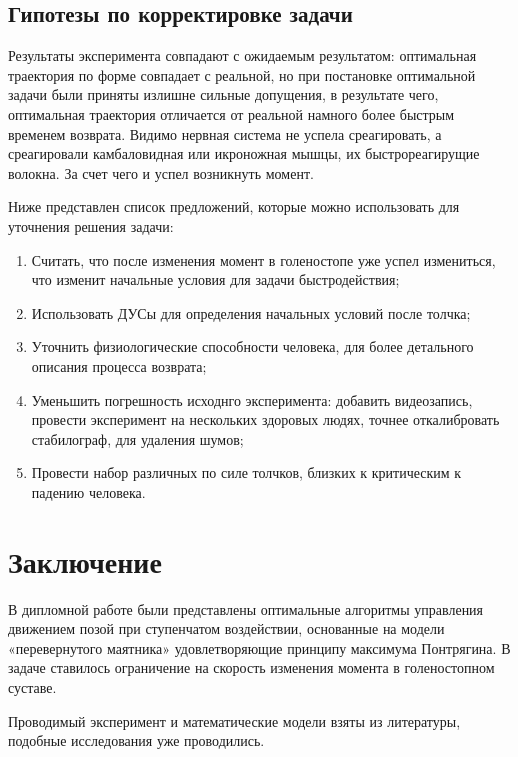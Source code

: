 \documentclass[a4paper,12pt, openany]{book}
\theoremstyle{plain} %
\theoremstyle{definition} %
\theoremstyle{remark} %
\numberwithin{equation}{chapter}
\begin{document}
{\section{Гипотезы по корректировке задачи}

Результаты эксперимента совпадают с ожидаемым результатом: оптимальная траектория по форме совпадает с реальной,
 но при постановке оптимальной задачи были приняты излишне сильные допущения, в результате чего, оптимальная траектория отличается от реальной намного более быстрым временем возврата.
Видимо нервная система не успела среагировать, а среагировали камбаловидная или икроножная мышцы, их быстрореагирущие волокна.
За счет чего и успел возникнуть момент.

Ниже представлен список предложений, которые можно использовать для уточнения решения задачи:
\begin{enumerate}
    \item Считать, что после изменения момент в голеностопе уже успел измениться, что изменит начальные условия для задачи быстродействия;
    \item Использовать ДУСы для определения начальных условий после толчка;
    \item Уточнить физиологические способности человека, для более детального описания процесса возврата;
    \item Уменьшить погрешность исходнго эксперимента: добавить видеозапись,
          провести эксперимент на нескольких здоровых людях, точнее откалибровать стабилограф, для удаления шумов;
    \item Провести набор различных по силе толчков, близких к критическим к падению человека.
\end{enumerate}


\newpage


\chapter*{Заключение}


В дипломной работе были представлены оптимальные алгоритмы управления
движением позой при ступенчатом воздействии, основанные на модели
«перевернутого маятника» удовлетворяющие принципу максимума Понтрягина.
В задаче ставилось ограничение на скорость изменения момента в голеностопном суставе.

Проводимый эксперимент и математические модели взяты из литературы, подобные исследования уже проводились.

}
\end{document}
